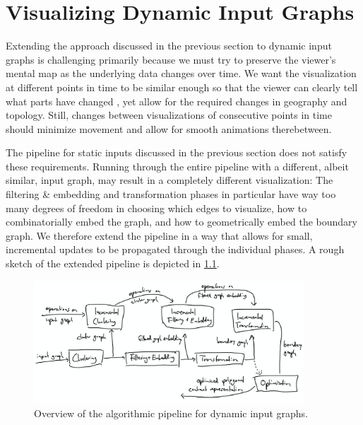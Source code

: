 \chapter{Visualizing Dynamic Input Graphs}
\label{chap:visualizing-dynamic-input-graphs}

Extending the approach discussed in the previous section to dynamic input graphs is challenging primarily because we must try to preserve the viewer's mental map as the underlying data changes over time. We want the visualization at different points in time to be similar enough so that the viewer can clearly tell what parts have changed \cite{mashima2011visualizing}, yet allow for the required changes in geography and topology. Still, changes between visualizations of consecutive points in time should minimize movement and allow for smooth animations therebetween.

The pipeline for static inputs discussed in the previous section does not satisfy these requirements. Running through the entire pipeline with a different, albeit similar, input graph, may result in a completely different visualization: The filtering \& embedding and transformation phases in particular have way too many degrees of freedom in choosing which edges to visualize, how to combinatorially embed the graph, and how to geometrically embed the boundary graph. We therefore extend the pipeline in a way that allows for small, incremental updates to be propagated through the individual phases. A rough sketch of the extended pipeline is depicted in \cref{fig:dynamic-pipeline}.


\begin{figure}[H]
	\centering\includegraphics[width=0.9\textwidth]{Resources/DynamicPipeline.png}
	\caption{Overview of the algorithmic pipeline for dynamic input graphs.}
	\label{fig:dynamic-pipeline}
\end{figure}


